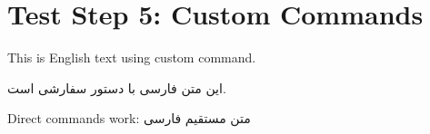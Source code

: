 \documentclass[12pt,a4paper]{article}
\newcommand{\persian}[1]{\textfarsi{#1}}
\newcommand{\eng}[1]{\textenglish{#1}}
\begin{document}
\section*{Test Step 5: Custom Commands}

\eng{This is English text using custom command.}

\persian{این متن فارسی با دستور سفارشی است.}

Direct commands work: \textfarsi{متن مستقیم فارسی}
\end{document}
